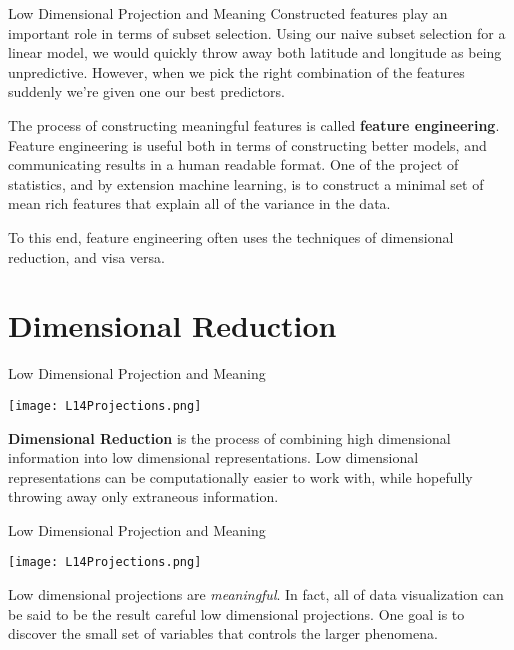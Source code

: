 \documentclass[10pt, table, dvipsnames,xcdraw,handout]{beamer}
\begin{document}
\begin{frame}[fragile]{Low Dimensional Projection and Meaning}
Constructed features play an important role in terms of subset selection. Using our naive subset selection for a linear model, we would quickly throw away both latitude and longitude as being unpredictive. However, when we pick the right combination of the features suddenly we're given one our best predictors.  \pause

The process of constructing meaningful features is called \textbf{feature engineering}. Feature engineering is useful both in terms of constructing better models, and communicating results in a human readable format. One of the project of statistics, and by extension machine learning, is to construct a minimal set of mean rich features that explain all of the variance in the data. \pause

To this end, feature engineering often uses the techniques of dimensional reduction, and visa versa. 
\end{frame}






\section{Dimensional Reduction}



\begin{frame}[fragile]{Low Dimensional Projection and Meaning}
  \begin{minipage}[t][0.5\textheight][t]{\textwidth}
	\centering \texttt{[image: L14Projections.png]} 
  \end{minipage}
  \vfill
\begin{minipage}[t][0.5\textheight][t]{\textwidth}
\textbf{Dimensional Reduction} is the process of combining high dimensional information into low dimensional representations. Low dimensional representations can be computationally easier to work with, while hopefully throwing away only extraneous information. 
\end{minipage}
\end{frame}




\begin{frame}[fragile]{Low Dimensional Projection and Meaning}
  \begin{minipage}[t][0.5\textheight][t]{\textwidth}
	\centering \texttt{[image: L14Projections.png]} 
  \end{minipage}
  \vfill
\begin{minipage}[t][0.5\textheight][t]{\textwidth}
Low dimensional projections are \emph{meaningful}. In fact, all of data visualization can be said to be the result careful low dimensional projections. One goal is to discover the small set of variables that controls the larger phenomena. 
\end{minipage}
\end{frame}
\end{document}
